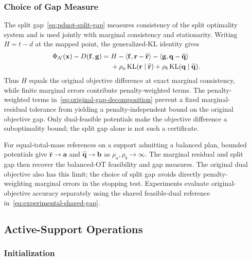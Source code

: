 \subsubsection{Choice of Gap Measure}
\label{app:gap-criterion}

The split gap~\eqref{eq:pduot-split-gap} measures consistency of the split optimality system and is used jointly with marginal consistency and stationarity.
Writing $H=t-d$ at the mapped point, the generalized-KL identity gives
\begin{equation}
\label{eq:original-gap-decomposition}
\begin{aligned}
\Phi_{\mathcal N}(\mathbf x)-D(\mathbf f,\mathbf g)
={}&H-\langle\mathbf f,\mathbf r-\widehat{\mathbf r}\rangle-\langle\mathbf g,\mathbf q-\widehat{\mathbf q}\rangle\\
&+\rho_a\operatorname{KL}(\mathbf r\mid\widehat{\mathbf r})+\rho_b\operatorname{KL}(\mathbf q\mid\widehat{\mathbf q}).
\end{aligned}
\end{equation}
Thus $H$ equals the original objective difference at exact marginal consistency, while finite marginal errors contribute penalty-weighted terms.
The penalty-weighted terms in~\eqref{eq:original-gap-decomposition} prevent a fixed marginal-residual tolerance from yielding a penalty-independent bound on the original objective gap.
Only dual-feasible potentials make the objective difference a suboptimality bound; the split gap alone is not such a certificate.

For equal-total-mass references on a support admitting a balanced plan, bounded potentials give $\widehat{\mathbf r}\to\mathbf a$ and $\widehat{\mathbf q}\to\mathbf b$ as $\rho_a,\rho_b\to\infty$.
The marginal residual and split gap then recover the balanced-OT feasibility and gap measures.
The original dual objective also has this limit; the choice of split gap avoids directly penalty-weighting marginal errors in the stopping test.
Experiments evaluate original-objective accuracy separately using the shared feasible-dual reference in~\eqref{eq:experimental-shared-gap}.

\subsection{Active-Support Operations}
\label{app:hierarchy-operations}

\subsubsection{Initialization}
\label{app:hierarchy-init}

